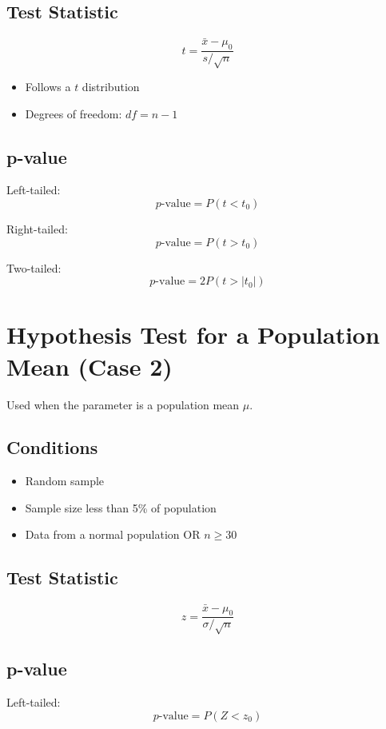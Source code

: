 \documentclass[11pt]{article}
\begin{document}
\subsection{Test Statistic}

\[
t =
\frac{\bar{x}-\mu_0}
{s/\sqrt{n}}
\]

\begin{itemize}
\item Follows a $t$ distribution
\item Degrees of freedom: $df = n-1$
\end{itemize}

\subsection{p-value}

Left-tailed:
\[
p\text{-value}=P(t<t_0)
\]

Right-tailed:
\[
p\text{-value}=P(t>t_0)
\]

Two-tailed:
\[
p\text{-value}=2P(t>|t_0|)
\]


\section{Hypothesis Test for a Population Mean (Case 2)}

Used when the parameter is a population mean $\mu$.

\subsection{Conditions}

\begin{itemize}
\item Random sample
\item Sample size less than 5\% of population
\item Data from a normal population OR $n \ge 30$
\end{itemize}

\subsection{Test Statistic}

\[
z =
\frac{\bar{x}-\mu_0}
{\sigma/\sqrt{n}}
\]

\subsection{p-value}

Left-tailed:
\[
p\text{-value}=P(Z<z_0)
\]
\end{document}
